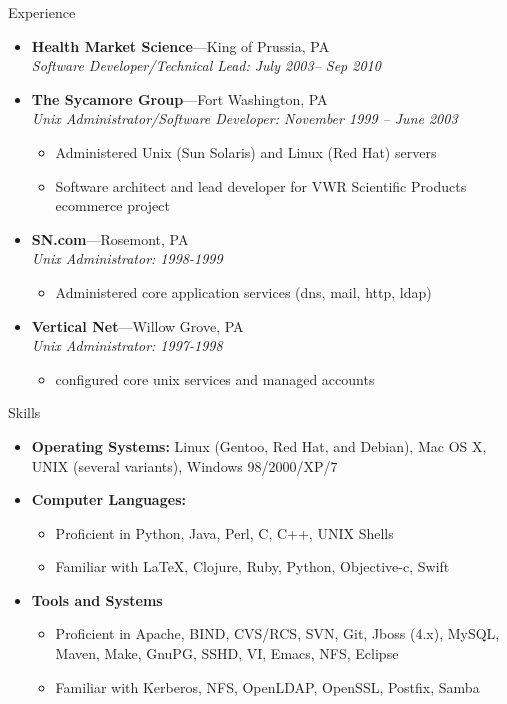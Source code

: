 \documentclass[11pt,oneside]{article}
\newenvironment{ressection}[1]{
        \vspace{4pt}
        {\fontfamily{phv}\selectfont\Large#1}
        \begin{itemize}
        \vspace{3pt}
}{
        \end{itemize}
}
\newcommand{\resitem}[1]{
        \vspace{-4pt}
        \item \begin{flushleft} #1 \end{flushleft}
}
\newcommand{\ressubitem}[1]{
        \vspace{-1pt}
        \item \begin{flushleft} #1 \end{flushleft}
}
\newcommand{\resbigitem}[3]{
        \vspace{-5pt}
        \item
        \textbf{#1}---#2 \\
        \textit{#3}
}
\newenvironment{ressubsec}[3]{
        \resbigitem{#1}{#2}{#3}
        \vspace{-2pt}
        \begin{itemize}
}{
        \end{itemize}
}
\newenvironment{reslist}[1]{
        \resitem{\textbf{#1}}
        \vspace{-5pt}
        \begin{itemize}
}{
        \end{itemize}
}
\begin{document}
\begin{ressection}{Experience}
\begin{ressubsec}{Health Market Science}{King of Prussia, PA}{Software Developer/Technical Lead: July 2003-- Sep 2010}
        \end{ressubsec}

        \begin{ressubsec}{The Sycamore Group}{Fort Washington, PA}{Unix Administrator/Software Developer: November 1999 -- June 2003}

          \ressubitem{Administered Unix (Sun Solaris) and Linux (Red Hat) servers}
          
          \ressubitem{Software architect and lead developer
            for VWR Scientific Products ecommerce project }


        \end{ressubsec}

        \begin{ressubsec}{SN.com}{Rosemont, PA}{Unix Administrator: 1998-1999}
          \ressubitem{Administered core application services (dns, mail, http, ldap)}
        \end{ressubsec}

        \begin{ressubsec}{Vertical Net}{Willow Grove, PA}{Unix Administrator: 1997-1998}
          \ressubitem{configured core unix services and managed accounts}
        \end{ressubsec}

\end{ressection}


\begin{ressection}{Skills}

  \resitem{\textbf{Operating Systems:} Linux (Gentoo, Red Hat, and
    Debian), Mac OS X, UNIX (several variants), Windows 98/2000/XP/7}

  \begin{reslist}{Computer Languages:}

    \ressubitem{Proficient in Python, Java, Perl, C, C++,  UNIX Shells}

    \ressubitem{Familiar with \LaTeX, Clojure, Ruby, Python, Objective-c, Swift}

  \end{reslist}

  \begin{reslist}{Tools and Systems}

    \ressubitem{Proficient in Apache, BIND, CVS/RCS, SVN, Git, Jboss
      (4.x), MySQL, Maven, Make, GnuPG, SSHD, VI, Emacs, NFS, Eclipse}

    \ressubitem{Familiar with Kerberos, NFS, OpenLDAP, OpenSSL, Postfix, Samba}

  \end{reslist}


\end{ressection}
\end{document}
